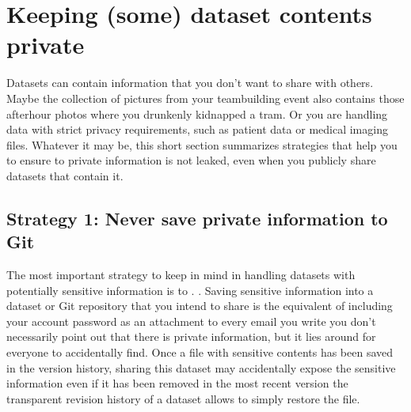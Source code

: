 \section{Keeping (some) dataset contents private}
\label{\detokenize{basics/101-139-privacy:keeping-some-dataset-contents-private}}\label{\detokenize{basics/101-139-privacy:privacy}}\label{\detokenize{basics/101-139-privacy:index-0}}\label{\detokenize{basics/101-139-privacy::doc}}
\sphinxAtStartPar
Datasets can contain information that you don’t want to share with others.
Maybe the collection of pictures from your team\sphinxhyphen{}building event also contains those after\sphinxhyphen{}hour photos where you drunkenly kidnapped a tram.
Or you are handling data with strict privacy requirements, such as patient data or
medical imaging files.
Whatever it may be, this short section summarizes strategies that help you to ensure
to private information is not leaked, even when you publicly share datasets that contain it.


\subsection{Strategy 1: Never save private information to Git}
\label{\detokenize{basics/101-139-privacy:strategy-1-never-save-private-information-to-git}}
\sphinxAtStartPar
The most important strategy to keep in mind in handling datasets with potentially sensitive information is to . .
Saving sensitive information into a dataset or Git repository that you intend to share is the equivalent of including your account password as an attachment to every email you write \textendash{} you don’t necessarily point out that there is private information, but it lies around for everyone to accidentally find.
Once a file with sensitive contents has been saved in the version history, sharing this dataset may accidentally expose the sensitive information even if it has been removed in the most recent version \textendash{} the transparent revision history of a dataset allows to simply restore the file.

